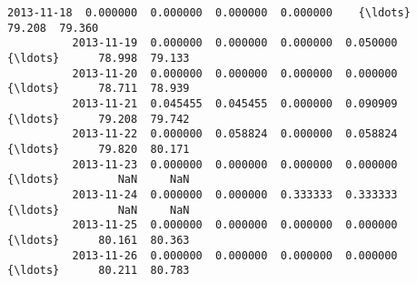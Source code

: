 \documentclass[11pt]{article}
\begin{document}
\begin{Verbatim}[commandchars=\\\{\}]
          2013-11-18  0.000000  0.000000  0.000000  0.000000    {\ldots}      79.208  79.360   
          2013-11-19  0.000000  0.000000  0.000000  0.050000    {\ldots}      78.998  79.133   
          2013-11-20  0.000000  0.000000  0.000000  0.000000    {\ldots}      78.711  78.939   
          2013-11-21  0.045455  0.045455  0.000000  0.090909    {\ldots}      79.208  79.742   
          2013-11-22  0.000000  0.058824  0.000000  0.058824    {\ldots}      79.820  80.171   
          2013-11-23  0.000000  0.000000  0.000000  0.000000    {\ldots}         NaN     NaN   
          2013-11-24  0.000000  0.000000  0.333333  0.333333    {\ldots}         NaN     NaN   
          2013-11-25  0.000000  0.000000  0.000000  0.000000    {\ldots}      80.161  80.363   
          2013-11-26  0.000000  0.000000  0.000000  0.000000    {\ldots}      80.211  80.783   
          

\end{Verbatim}
\end{document}
